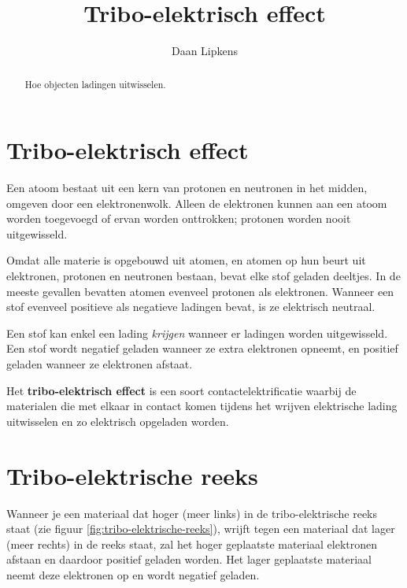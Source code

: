\documentclass{ximera}
\title{Tribo-elektrisch effect}
\author{Daan Lipkens}
\begin{document}
\begin{abstract}
    Hoe objecten ladingen uitwisselen.
\end{abstract}
\maketitle
\section{Tribo-elektrisch effect}
\begin{remark}[foldable=true,title={Lading in een atoom}]\nl
Een atoom bestaat uit een kern van protonen en neutronen in het midden, omgeven door een elektronenwolk. Alleen de elektronen kunnen aan een atoom worden toegevoegd of ervan worden onttrokken; protonen worden nooit uitgewisseld.
\end{remark}

Omdat alle materie is opgebouwd uit atomen, en atomen op hun beurt uit elektronen, protonen en neutronen bestaan, bevat elke stof geladen deeltjes. In de meeste gevallen bevatten atomen evenveel protonen als elektronen. Wanneer een stof evenveel positieve als negatieve ladingen bevat, is ze elektrisch neutraal.

Een stof kan enkel een lading \textit{krijgen} wanneer er ladingen worden uitgewisseld. Een stof wordt negatief geladen wanneer ze extra elektronen opneemt, en positief geladen wanneer ze elektronen afstaat.

\begin{definition}[foldable=true,title={Tribo-elektrisch effect}]\nl
    Het \textbf{tribo-elektrisch effect} is een soort contactelektrificatie waarbij de materialen die met elkaar in contact komen tijdens het wrijven elektrische lading uitwisselen en zo elektrisch opgeladen worden.
\end{definition}
\section{Tribo-elektrische reeks}
Wanneer je een materiaal dat hoger (meer links) in de tribo-elektrische reeks staat (zie figuur \ref{fig:tribo-elektrische-reeks}), wrijft tegen een materiaal dat lager (meer rechts) in de reeks staat, zal het hoger geplaatste materiaal elektronen afstaan en daardoor positief geladen worden. Het lager geplaatste materiaal neemt deze elektronen op en wordt negatief geladen.
\end{document}
